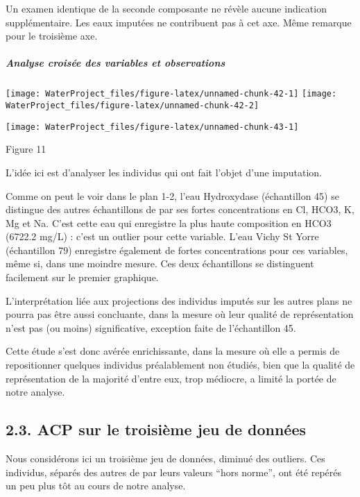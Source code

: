 \documentclass[]{article}
\let\oldsubparagraph\subparagraph
\renewcommand{\subparagraph}[1]{\oldsubparagraph{#1}\mbox{}}
\begin{document}
Un examen identique de la seconde composante ne révèle aucune indication
supplémentaire. Les eaux imputées ne contribuent pas à cet axe. Même
remarque pour le troisième axe.

\subparagraph{\texorpdfstring{Analyse croisée des variables et
observations}{ Analyse croisée des variables et observations}}\label{analyse-croisee-des-variables-et-observations-1}

\texttt{[image: WaterProject\_files/figure-latex/unnamed-chunk-42-1]}
\texttt{[image: WaterProject\_files/figure-latex/unnamed-chunk-42-2]}

\begin{center}\texttt{[image: WaterProject\_files/figure-latex/unnamed-chunk-43-1]} \end{center}

Figure 11

L'idée ici est d'analyser les individus qui ont fait l'objet d'une
imputation.

Comme on peut le voir dans le plan 1-2, l'eau Hydroxydase (échantillon
45) se distingue des autres échantillons de par ses fortes
concentrations en Cl, HCO3, K, Mg et Na. C'est cette eau qui enregistre
la plus haute composition en HCO3 (6722.2 mg/L) : c'est un outlier pour
cette variable. L'eau Vichy St Yorre (échantillon 79) enregistre
également de fortes concentrations pour ces variables, même si, dans une
moindre mesure. Ces deux échantillons se distinguent facilement sur le
premier graphique.

L'interprétation liée aux projections des individus imputés sur les
autres plans ne pourra pas être aussi concluante, dans la mesure où leur
qualité de représentation n'est pas (ou moins) significative, exception
faite de l'échantillon 45.

Cette étude s'est donc avérée enrichissante, dans la mesure où elle a
permis de repositionner quelques individus préalablement non étudiés,
bien que la qualité de représentation de la majorité d'entre eux, trop
médiocre, a limité la portée de notre analyse.

\hypertarget{acp-sur-le-troisieme-jeu-de-donnees}{\subsection{2.3. ACP
sur le troisième jeu de
données}\label{acp-sur-le-troisieme-jeu-de-donnees}}

Nous considérons ici un troisième jeu de données, diminué des outliers.
Ces individus, séparés des autres de par leurs valeurs ``hors norme'',
ont été repérés un peu plus tôt au cours de notre analyse.
\end{document}
